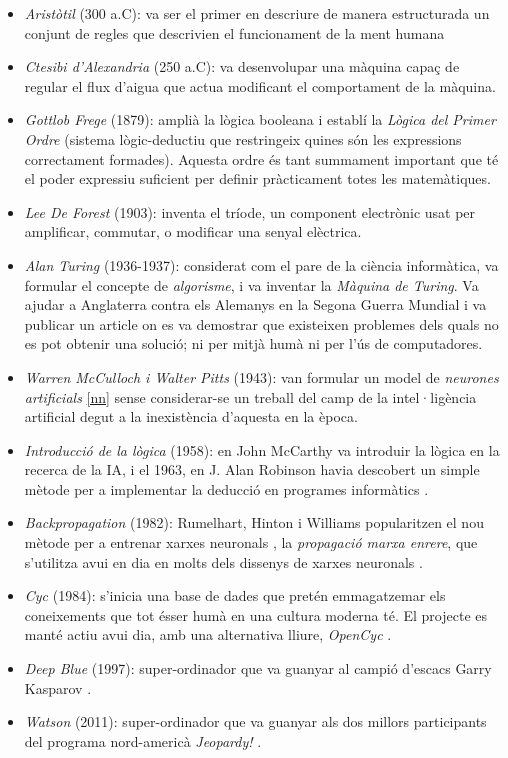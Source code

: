\begin{itemize}
\item  \emph{Aristòtil} (300 a.C): va ser el primer en descriure de manera estructurada un conjunt de regles que descrivien el funcionament de la ment humana
\item  \emph{Ctesibi d'Alexandria} (250 a.C): va desenvolupar una màquina capaç de regular el flux d'aigua que actua modificant el comportament de la màquina.
\item \emph{Gottlob Frege} (1879): amplià la lògica booleana i establí la \emph{Lògica del Primer Ordre} (sistema lògic-deductiu que restringeix quines són les expressions correctament formades). Aquesta ordre és tant summament important que té el poder expressiu suficient per definir pràcticament totes les matemàtiques.
\item \emph{Lee De Forest} (1903): inventa el tríode, un component electrònic usat per amplificar, commutar, o modificar una senyal elèctrica. \cite{Tri}
\item \emph{Alan Turing} (1936-1937): considerat com el pare de la ciència informàtica, va formular el concepte de \emph{algorisme}, i va inventar la \emph{Màquina de Turing}. Va ajudar a Anglaterra contra els Alemanys en la Segona Guerra Mundial i va publicar un article on es va demostrar que existeixen problemes dels quals no es pot obtenir una solució; ni per mitjà humà ni per l'ús de computadores.
\item \emph{Warren McCulloch i Walter Pitts} (1943): van formular un model de \emph{neurones artificials} \ref{nn} sense considerar-se un treball del camp de la intel·ligència artificial degut a la inexistència d'aquesta en la època.\cite{EvoIA}
\item \emph{Introducció de la lògica} (1958): en John McCarthy va introduir la lògica en la recerca de la IA, i el 1963, en J. Alan Robinson havia descobert un simple mètode per a implementar la deducció en programes informàtics \cite{machineswhothink}.
\item \emph{Backpropagation} (1982): Rumelhart, Hinton i Williams popularitzen el nou mètode per a entrenar xarxes neuronals \cite{mlintro}, la \emph{propagació marxa enrere}, que s'utilitza avui en dia en molts dels dissenys de xarxes neuronals \cite{mlalgo09}.
\item \emph{Cyc} (1984): s'inicia una base de dades que pretén emmagatzemar els coneixements que tot ésser humà en una cultura moderna té. El projecte es manté actiu avui dia, amb una alternativa lliure, \emph{OpenCyc} \cite{opencyc}.
\item \emph{Deep Blue} (1997): super-ordinador que va guanyar al campió d'escacs Garry Kasparov \cite{deepblue}.
\item \emph{Watson} (2011): super-ordinador que va guanyar als dos millors participants del programa nord-americà \emph{Jeopardy!} \cite{watsonjeopardy}.
\end{itemize}

